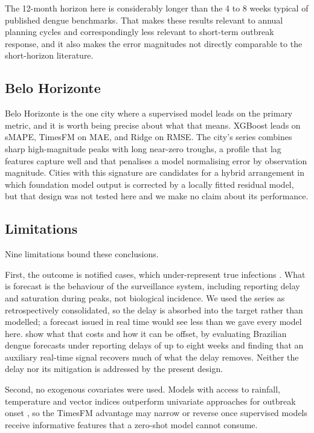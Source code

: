 \documentclass[11pt]{article}
\begin{document}
The 12-month horizon here is considerably longer than the 4 to 8 weeks typical of
published dengue benchmarks. That makes these results relevant to annual planning cycles
and correspondingly less relevant to short-term outbreak response, and it also makes the
error magnitudes not directly comparable to the short-horizon literature.

\subsection{Belo Horizonte}

Belo Horizonte is the one city where a supervised model leads on the primary metric, and
it is worth being precise about what that means. XGBoost leads on sMAPE, TimesFM on MAE,
and Ridge on RMSE. The city's series combines sharp high-magnitude peaks with long near-zero
troughs, a profile that lag features capture well and that penalises a model normalising
error by observation magnitude. Cities with this signature are candidates for a hybrid
arrangement in which foundation model output is corrected by a locally fitted residual
model, but that design was not tested here and we make no claim about its performance.

\subsection{Limitations}

Nine limitations bound these conclusions.

First, the outcome is notified cases, which under-represent true infections
\citep{Siqueira2022}. What is forecast is the behaviour of the surveillance system,
including reporting delay and saturation during peaks, not biological incidence. We used
the series as retrospectively consolidated, so the delay is absorbed into the target
rather than modelled; a forecast issued in real time would see less than we gave every
model here. \citet{Palmer2026hosp} show what that costs and how it can be offset, by
evaluating Brazilian dengue forecasts under reporting delays of up to eight weeks and
finding that an auxiliary real-time signal recovers much of what the delay removes.
Neither the delay nor its mitigation is addressed by the present design.

Second, no exogenous covariates were used. Models with access to rainfall, temperature
and vector indices outperform univariate approaches for outbreak onset
\citep{Barcellos2024,Fang2024}, so the TimesFM advantage may narrow or reverse once
supervised models receive informative features that a zero-shot model cannot consume.
\end{document}
